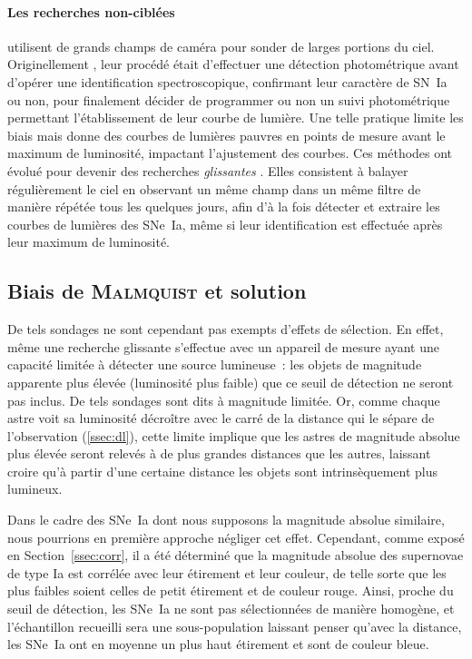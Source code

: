 \documentclass[../main/main.tex]{subfiles}
\begin{document}
\paragraph*{Les recherches non-ciblées} utilisent de grands champs de caméra pour
sonder de larges portions du ciel. Originellement
\citep[SCP,][]{perlmutter1999}, leur procédé était d'effectuer une
détection photométrique avant d'opérer une identification spectroscopique,
confirmant leur caractère de SN~Ia ou non, pour finalement décider de programmer
ou non un suivi photométrique permettant l'établissement de leur courbe de
lumière. Une telle pratique limite les biais mais donne des courbes de lumières
pauvres en points de mesure avant le maximum de luminosité, impactant
l'ajustement des courbes. Ces méthodes ont évolué pour devenir des recherches
\textit{glissantes} \citep{astier2006}. Elles consistent à balayer régulièrement
le ciel en observant un même champ dans un même filtre de manière répétée tous
les quelques jours, afin d'à la fois détecter et extraire les courbes de
lumières des SNe~Ia, même si leur identification est effectuée après leur
maximum de luminosité.

\subsection{Biais de \textsc{Malmquist} et solution}\label{ssec:malm}

De tels sondages ne sont cependant pas exempts d'effets de sélection. En effet,
même une recherche glissante s'effectue avec un appareil de mesure ayant une
capacité limitée à détecter une source lumineuse~: les objets de magnitude
apparente plus élevée (luminosité plus faible) que ce seuil de détection ne
seront pas inclus. De tels sondages sont dits à magnitude limitée. Or, comme
chaque astre voit sa luminosité décroître avec le carré de la distance qui le
sépare de l'observation (\ref{ssec:dl}), cette limite implique que les astres de
magnitude absolue plus élevée seront relevés à de plus grandes distances que les
autres, laissant croire qu'à partir d'une certaine distance les objets sont
intrinsèquement plus lumineux.

Dans le cadre des SNe~Ia dont nous supposons la magnitude absolue similaire,
nous pourrions en première approche négliger cet effet. Cependant, comme exposé
en Section~\ref{ssec:corr}, il a été déterminé que la magnitude absolue des
supernovae de type Ia est corrélée avec leur étirement et leur couleur, de telle
sorte que les plus faibles soient celles de petit étirement et de couleur rouge.
Ainsi, proche du seuil de détection, les SNe~Ia ne sont pas sélectionnées de
manière homogène, et l'échantillon recueilli sera une sous-population laissant
penser qu'avec la distance, les SNe~Ia ont en moyenne un plus haut étirement et
sont de couleur bleue.
\end{document}
